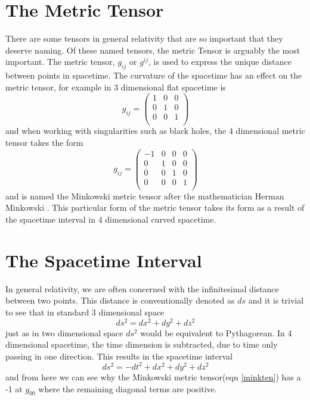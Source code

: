 \documentclass[12pt, oneside]{smuthesis}
\newcommand{\contensor}[2]{{#1}^{#2}}
\newcommand{\covtensor}[2]{{#1}_{#2}}
\begin{document}
\section{\sc The Metric Tensor} \label{metricTensor}

There are some tensors in general relativity that are so important that they deserve naming. Of these named tensors, the metric Tensor is arguably the most important. The metric tensor, $\covtensor{g}{ij}$ or $\contensor{g}{ij}$, is used to express the unique distance between points in spacetime. The curvature of the spacetime has an effect on the metric tensor, for example in 3 dimensional flat spacetime is
\begin{equation}
\covtensor{g}{ij}=
\begin{pmatrix}
1 & 0 & 0 \\
0 & 1 & 0 \\
0 & 0 & 1 \\
\end{pmatrix}
\end{equation}\label{genten}
and when working with singularities such as black holes, the 4 dimensional metric tensor takes the form
\begin{equation}
\covtensor{g}{ij}=
\begin{pmatrix}
-1 & 0 & 0 & 0 \\
0 & 1 & 0 & 0 \\
0 & 0 & 1 & 0 \\
0 & 0 & 0 & 1 \\
\end{pmatrix}
\end{equation}\label{minkten}
and is named the Minkowski metric tensor after the mathematician Herman Minkowski \cite{spruin}. This particular form of the metric tensor takes its form as a result of the spacetime interval in 4 dimensional curved spacetime.

\section{\sc The Spacetime Interval} \label{spacetimeInterval}

In general relativity, we are often concerned with the infinitesimal distance between two points. This distance is conventionally denoted as $ds$ and it is trivial to see that in standard 3 dimensional space
\begin{equation}
\nonumber
ds^{2}=dx^{2}+dy^{2}+dz^{2}
\end{equation}
just as in two dimensional space $ds^{2}$ would be equivalent to Pythagorean. In 4 dimensional spacetime, the time dimension is subtracted, due to time only passing in one direction. This results in the spacetime interval
\begin{equation}
ds^{2}=-dt^{2}+dx^{2}+dy^{2}+dz^{2}
\end{equation}
and from here we can see why the Minkowski metric tensor(eqn \ref{minkten}) has a -1 at $\covtensor{g}{00}$ where the remaining diagonal terms are positive.
\end{document}
